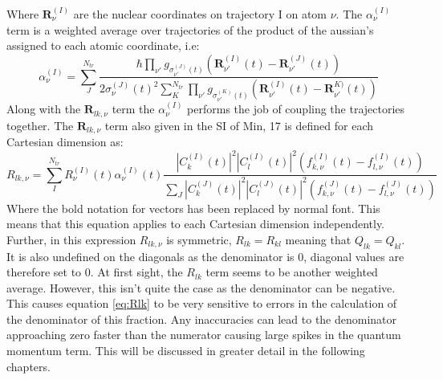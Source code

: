 Where $\mathbf{R}_{\nu}^{(I)}$ are the nuclear coordinates on trajectory I on atom $\nu$. The $\alpha_{\nu}^{(I)}$ term is a weighted  average over trajectories of the product of the aussian's assigned to each atomic coordinate, i.e:
\begin{equation}
  \alpha_{\nu}^{(I)} = \sum_{J}^{N_{tr}} \frac{\hbar \prod_{\nu'} g_{\sigma_{\nu'}^{(J)}(t)}\left(\mathbf{R}_{\nu'}^{(I)}(t) -         \mathbf{R}_{\nu'}^{(J)}(t)\right)}   {2 \sigma_{\nu}^{(J)}(t)^2\sum_{K}^{N_{tr}}\prod_{\nu'}                                           g_{\sigma_{\nu'}^{(K)}(t)}\left(\mathbf{R}_{\nu'}^{(I)}(t) - \mathbf{R}_{\nu'}^{K)}(t)\right)}
  \label{eq:alpha}
\end{equation}
Along with the $\mathbf{R}_{lk, \nu}$ term the $\alpha_{\nu}^{(I)}$ performs the job of coupling the trajectories together. The $\mathbf{R}_{lk, \nu}$ term also given in the SI of Min, 17\cite{min_ab_2017} is defined for each Cartesian dimension as:
\begin{equation}
  R_{lk, \nu} = \sum_{I}^{N_{tr}} R_{\nu}^{(I)}(t) \alpha_{\nu}^{(I)}(t) \frac{|C_{k}^{(I)}(t)|^2 |C_{l}^{(I)}(t)|^2 \left( f_{k,      \nu}^{(I)}(t) - f_{l, \nu}^{(I)}(t) \right)}{\sum_{J} |C_{k}^{(J)}(t)|^2 |C_{l}^{(J)}(t)|^2 \left( f_{k, \nu}^{(J)}(t) - f_{l,         \nu}^{(J)}(t) \right)}
  \label{eq:Rlk}
\end{equation}
Where the bold notation for vectors has been replaced by normal font. This means that this equation applies to each Cartesian dimension independently. Further, in this expression $R_{lk, \nu}$ is symmetric, $R_{lk} = R_{kl}$ meaning that $Q_{lk} = Q_{kl}$. It is also undefined on the diagonals as the denominator is 0, diagonal values are therefore set to 0. At first sight, the $R_{lk}$ term seems to be another weighted average. However, this isn't quite the case as the denominator can be negative. This causes equation \eqref{eq:Rlk} to be very sensitive to errors in the calculation of the denominator of this fraction. Any inaccuracies can lead to the denominator approaching zero faster than the numerator causing large spikes in the quantum momentum term. This will be discussed in greater detail in the following chapters.






